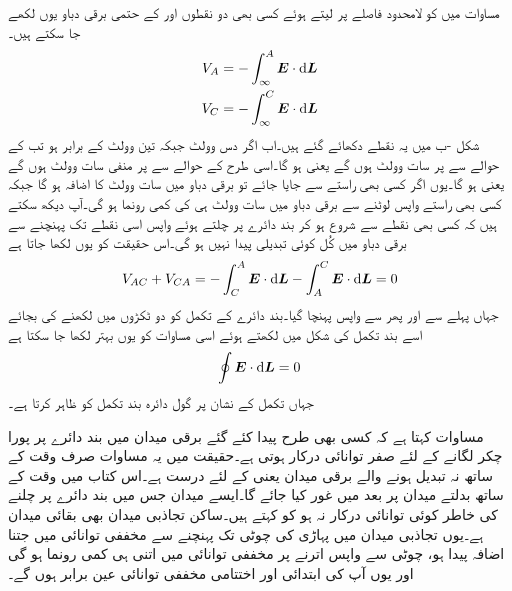 مساوات  میں  کو لامحدود فاصلے پر لیتے ہوئے کسی بھی دو نقطوں  اور  کے حتمی برقی دباو یوں لکھے جا سکتے ہیں۔
\begin{align*}
V_A&=-\int_{\infty}^{A} \kvec{E} \cdot \dif \kvec{L}\\
V_C&=-\int_{\infty}^{C} \kvec{E} \cdot \dif \kvec{L}
\end{align*}
شکل -ب میں یہ نقطے دکھائے گئے ہیں۔اب اگر  دس وولٹ جبکہ  تین وولٹ کے برابر ہو تب  کے حوالے سے  پر سات وولٹ ہوں گے یعنی   ہو گا۔اسی طرح  کے حوالے سے  پر منفی سات وولٹ ہوں گے یعنی  ہو گا۔یوں اگر کسی بھی راستے   سے  جایا جائے تو برقی دباو میں سات وولٹ کا اضافہ ہو گا جبکہ کسی بھی راستے واپس  لوٹنے سے برقی دباو میں سات وولٹ ہی کی کمی رونما ہو گی۔آپ دیکھ سکتے ہیں کہ کسی بھی نقطے سے شروع ہو کر بند دائرے پر چلتے ہوئے واپس اسی نقطے تک پہنچنے سے برقی دباو میں کُل کوئی تبدیلی پیدا نہیں ہو گی۔اس حقیقت کو یوں لکھا جاتا ہے
\begin{align*}
V_{AC}+V_{CA}=-\int_{C}^{A} \kvec{E} \cdot \dif \kvec{L}-\int_{A}^{C} \kvec{E} \cdot \dif \kvec{L}=0
\end{align*}
جہاں پہلے  سے  اور پھر  سے واپس  پہنچا گیا۔بند دائرے کے تکمل کو دو ٹکڑوں میں لکھنے کی بجائے اسے بند تکمل کی شکل میں لکھتے ہوئے اسی مساوات کو یوں بہتر لکھا جا سکتا ہے 
\begin{align}\label{مساوات_توانائی_بند_راستا}
\oint \kvec{E} \cdot \dif \kvec{L}=0
\end{align}
جہاں تکمل کے نشان پر گول دائرہ بند تکمل کو ظاہر کرتا ہے۔

مساوات  کہتا ہے کہ کسی بھی طرح پیدا کئے گئے برقی میدان میں بند دائرے پر پورا چکر لگانے کے لئے صفر توانائی درکار ہوتی ہے۔حقیقت میں یہ مساوات صرف وقت کے ساتھ نہ تبدیل ہونے والے برقی میدان یعنی   کے لئے درست ہے۔اس کتاب میں وقت کے ساتھ بدلتے میدان پر بعد میں غور کیا جائے گا۔ایسے میدان جس میں بند دائرے پر چلنے کی خاطر کوئی توانائی درکار نہ ہو کو  کہتے ہیں۔ساکن تجاذبی میدان بھی بقائی میدان ہے۔یوں تجاذبی میدان میں پہاڑی کی چوٹی تک پہنچنے سے مخففی توانائی میں جتنا اضافہ پیدا ہو، چوٹی سے واپس اترنے پر مخففی توانائی میں اتنی ہی کمی رونما ہو گی اور یوں آپ کی ابتدائی اور اختتامی مخففی توانائی عین برابر ہوں گے۔

